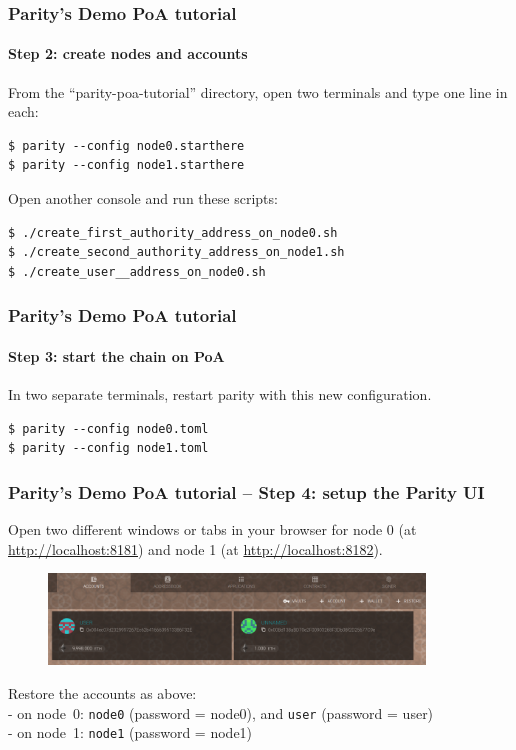 \begin{frame}[fragile]
	\frametitle{Parity's Demo PoA tutorial}
	\framesubtitle{Step 2: create nodes and accounts}
	From the ``parity-poa-tutorial'' directory, open two terminals and type one line in each:
	\vspace{0.5em}
	\begin{Verbatim}[fontsize=\tiny]
$ parity --config node0.starthere
$ parity --config node1.starthere
	\end{Verbatim}
	\vspace{0.5em}
	Open another console and run these scripts:
	\begin{Verbatim}[fontsize=\tiny]
$ ./create_first_authority_address_on_node0.sh
$ ./create_second_authority_address_on_node1.sh
$ ./create_user__address_on_node0.sh 
	\end{Verbatim}
\end{frame}

\begin{frame}[fragile]
	\frametitle{Parity's Demo PoA tutorial}
	\framesubtitle{Step 3: start the chain on PoA}
	In two separate terminals, restart parity with this new configuration.
	\begin{Verbatim}[fontsize=\tiny]
$ parity --config node0.toml
$ parity --config node1.toml
	\end{Verbatim}
\end{frame}

\begin{frame}[fragile]
	\frametitle{Parity's Demo PoA tutorial -- Step 4: setup the Parity UI}
	Open two different windows or tabs in your browser for node 0 (at \url{http://localhost:8181}) and node 1 (at \url{http://localhost:8182}).
	\begin{figure}
		\includegraphics[width=10cm]{../pics/ethereum/parity-poa-tutorial/node0-two-accounts}
	\end{figure}
	Restore the accounts as above:\\
	- on node~0: \texttt{node0} (password = node0), and \texttt{user} (password = user)\\
	- on node~1: \texttt{node1} (password = node1)
\end{frame}

